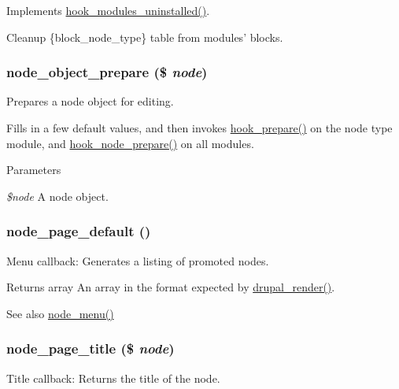 \label{node_8module_a66de7f3493edd4a5e015a48a31992e0a}
Implements \hyperlink{group__hooks_ga4f29c7343438068a922459cbe0810279}{hook\_\-modules\_\-uninstalled()}.

Cleanup \{block\_\-node\_\-type\} table from modules' blocks. \hypertarget{node_8module_ac12e464390fef44e55ddc2e0a35e9fe2}{
\subsubsection[{node\_\-object\_\-prepare}]{\setlength{\rightskip}{0pt plus 5cm}node\_\-object\_\-prepare (\$ {\em node})}}
\label{node_8module_ac12e464390fef44e55ddc2e0a35e9fe2}
Prepares a node object for editing.

Fills in a few default values, and then invokes \hyperlink{group__node__api__hooks_ga2dff6dd92802df6b776a4eeb0b1a737c}{hook\_\-prepare()} on the node type module, and \hyperlink{group__node__api__hooks_ga4bbe7320bd52fc6183920c8be2d9d4f6}{hook\_\-node\_\-prepare()} on all modules.


\begin{DoxyParams}{Parameters}
\item[{\em \$node}]A node object. \end{DoxyParams}
\hypertarget{node_8module_a8886b7d16fd0bae8b3ff89193c52d3cf}{
\subsubsection[{node\_\-page\_\-default}]{\setlength{\rightskip}{0pt plus 5cm}node\_\-page\_\-default ()}}
\label{node_8module_a8886b7d16fd0bae8b3ff89193c52d3cf}
Menu callback: Generates a listing of promoted nodes.

\begin{DoxyReturn}{Returns}
array An array in the format expected by \hyperlink{common_8inc_a05798b44e8d6c496d4bee5cc32fa7851}{drupal\_\-render()}.
\end{DoxyReturn}
\begin{DoxySeeAlso}{See also}
\hyperlink{node_8module_a15e8d85a7559f22b8f2c77c1d5dfac63}{node\_\-menu()} 
\end{DoxySeeAlso}
\hypertarget{node_8module_acc30cb4ee1c9fd09fefbf193956f76e9}{
\subsubsection[{node\_\-page\_\-title}]{\setlength{\rightskip}{0pt plus 5cm}node\_\-page\_\-title (\$ {\em node})}}
\label{node_8module_acc30cb4ee1c9fd09fefbf193956f76e9}
Title callback: Returns the title of the node.


